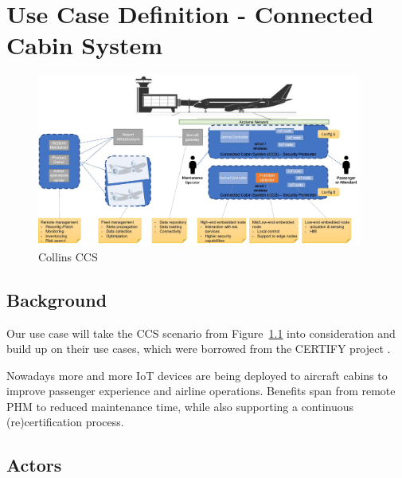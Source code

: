 \chapter{Use Case Definition - Connected Cabin System}
\label{chap:Use Case Definition - Connected Cabin System}

\begin{figure}
	\begin{center}
		\includegraphics[width=0.95\textwidth]{figures/collins-ccs.jpg}
	\end{center}
	\caption{Collins CCS}
	\label{fig:Collins CCS}
\end{figure}

\section{Background} %
\label{sec:Background}

Our use case will take the CCS scenario from Figure~\ref{fig:Collins CCS} into consideration and build up on their use
cases, which were borrowed from the CERTIFY project \cite{certifyproject2023}.

Nowadays more and more IoT devices are being deployed to aircraft cabins to improve passenger experience and airline
operations. Benefits span from remote PHM to reduced maintenance time, while also supporting a
continuous (re)certification process. %


\section{Actors} %
\label{sec:Actors}

